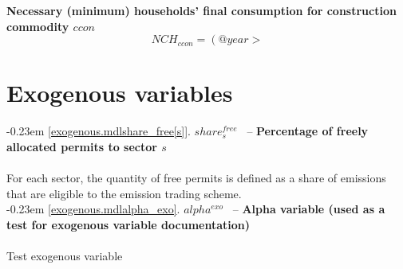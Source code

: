 \documentclass[12pt]{article}
\numberwithin{equation}{section}
\begin{document}
\noindent \textbf{Necessary (minimum) households' final consumption for construction commodity $ccon$} 
\begin{dmath}
NCH_{ccon} = \left( @year > %
\label{ETS.mdlNCH[ccon]}
\end{dmath}
\newpage\section{Exogenous variables}



\noindent \kern-0.23em \noindent \begingroup {} \label{exogenous.mdlshare_free[s]}\ref{exogenous.mdlshare_free[s]}.
         
        \ensuremath{share^{free}_{s}}~ \endgroup -- \noindent \textbf{Percentage of freely allocated permits to sector $s$}  \\ \\[-8pt]For each sector, the quantity of free permits is defined as a share of emissions that are eligible to the emission trading scheme. \\




\noindent \kern-0.23em \noindent \begingroup {} \label{exogenous.mdlalpha_exo}\ref{exogenous.mdlalpha_exo}.
         
        \ensuremath{alpha^{exo}}~ \endgroup -- \noindent \textbf{Alpha variable (used as a test for exogenous variable documentation)}  \\ \\[-8pt]Test exogenous variable
\newpage
\end{document}
